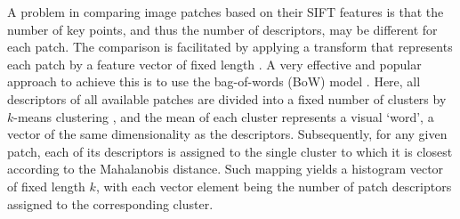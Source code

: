 

A problem in comparing image patches based on their SIFT features is that the number of key points, and thus the number of descriptors, may be different for each patch. The comparison is facilitated by applying a transform that represents each patch by a feature vector of fixed length {\color{red}\citep{Yang}}. A very effective and popular approach to achieve this is to use the bag-of-words (BoW) model {\color{red}\citep{FeiFei}}. Here, all descriptors of all available patches are divided into a fixed number of clusters by $k$-means clustering \citep{macqueen1967}, and the mean of each cluster represents a visual `word', a vector of the same dimensionality as the descriptors. Subsequently, for any given patch, each of its descriptors is assigned to the {\color{red}single} cluster to which it is closest according to the Mahalanobis distance. {\color{red}Such mapping yields a histogram} vector of fixed length $k$, with each vector element being the number of patch descriptors assigned to the corresponding cluster.

